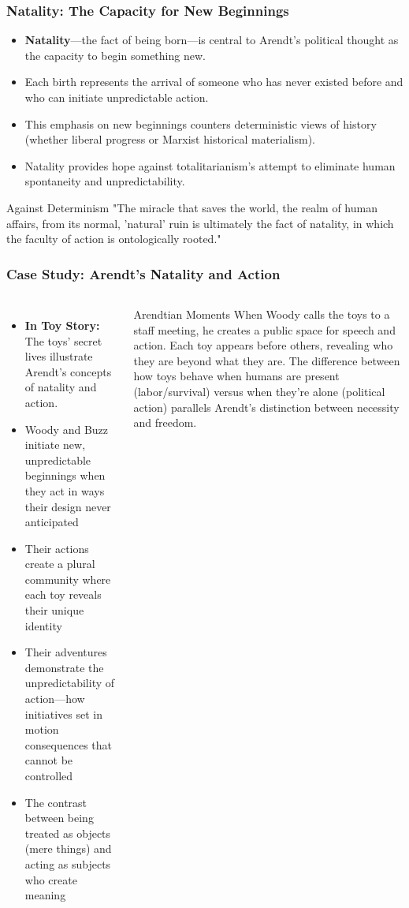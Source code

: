 \documentclass{beamer}
\begin{document}
\begin{frame}
\frametitle{Natality: The Capacity for New Beginnings}
\begin{itemize}
    \item \textbf{Natality}—the fact of being born—is central to Arendt's political thought as the capacity to begin something new.
    \item Each birth represents the arrival of someone who has never existed before and who can initiate unpredictable action.
    \item This emphasis on new beginnings counters deterministic views of history (whether liberal progress or Marxist historical materialism).
    \item Natality provides hope against totalitarianism's attempt to eliminate human spontaneity and unpredictability.
\end{itemize}

\begin{alertblock}{Against Determinism}
"The miracle that saves the world, the realm of human affairs, from its normal, 'natural' ruin is ultimately the fact of natality, in which the faculty of action is ontologically rooted."
\end{alertblock}
\end{frame}

\begin{frame}
    \frametitle{Case Study: Arendt's Natality and Action}
    \begin{columns}
        \small
    \begin{itemize}
        \item \textbf{In Toy Story:} The toys' secret lives illustrate Arendt's concepts of natality and action.
        \item Woody and Buzz initiate new, unpredictable beginnings when they act in ways their design never anticipated
        \item Their actions create a plural community where each toy reveals their unique identity
        \item Their adventures demonstrate the unpredictability of action—how initiatives set in motion consequences that cannot be controlled
        \item The contrast between being treated as objects (mere things) and acting as subjects who create meaning
    \end{itemize}
    
    \begin{exampleblock}{Arendtian Moments}
    When Woody calls the toys to a staff meeting, he creates a public space for speech and action. Each toy appears before others, revealing who they are beyond what they are. The difference between how toys behave when humans are present (labor/survival) versus when they're alone (political action) parallels Arendt's distinction between necessity and freedom.
    \end{exampleblock}
    \end{columns}
    \end{frame}
\end{document}
